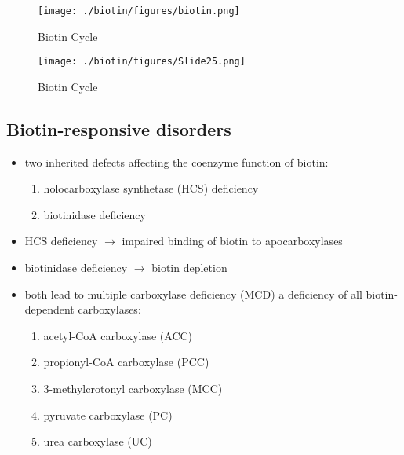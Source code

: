 \documentclass{scrartcl}
\begin{document}
\begin{figure}[htbp]
\centering
\texttt{[image: ./biotin/figures/biotin.png]}
\caption{\label{fig:org9ff91e2}
Biotin Cycle}
\end{figure}

\begin{figure}[htbp]
\centering
\texttt{[image: ./biotin/figures/Slide25.png]}
\caption{\label{fig:orgf7731f7}
Biotin Cycle}
\end{figure}

\subsection{Biotin-responsive disorders}
\label{sec:org0861ec8}
\begin{itemize}
\item two inherited defects affecting the coenzyme function of biotin:
\begin{enumerate}
\item holocarboxylase synthetase (HCS) deficiency
\item biotinidase deficiency
\end{enumerate}
\item HCS deficiency \(\to\) impaired binding of biotin to apocarboxylases
\item biotinidase deficiency \(\to\) biotin depletion
\item both lead to multiple carboxylase deficiency (MCD) a deficiency of
all biotin-dependent carboxylases:
\begin{enumerate}
\item acetyl-CoA carboxylase (ACC)
\item propionyl-CoA carboxylase (PCC)
\item 3-methylcrotonyl carboxylase (MCC)
\item pyruvate carboxylase (PC)
\item urea carboxylase (UC)
\end{enumerate}
\end{itemize}
\end{document}
